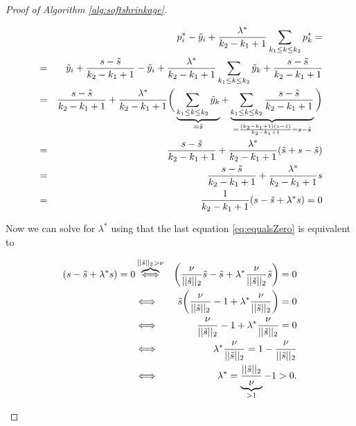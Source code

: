 \begin{proof}[Proof of Algorithm \ref{alg:softshrinkage}]
\begin{enumerate}
                \begin{eqnarray}
                    &&p^{\ast}_{i} - \tilde{y}_{i} + \frac{\lambda^{\ast}}{k_{2} - k_{1} + 1} \sum_{k_{1} \le k \le k_{2}} p^{\ast}_{k} = \notag \\
                    &=& \tilde{y}_{i} + \frac{s - \tilde{s}}{k_{2} - k_{1} + 1} - \tilde{y}_{i} + \frac{\lambda^{\ast}}{k_{2} - k_{1} + 1} \sum_{k_{1} \le k \le k_{2}} \tilde{y}_{k} + \frac{s - \tilde{s}}{k_{2} - k_{1} + 1} \notag \\
                    &=& \frac{s - \tilde{s}}{k_{2} - k_{1} + 1} + \frac{\lambda^{\ast}}{k_{2} - k_{1} + 1} \bigg( \underbrace{\sum_{k_{1} \le k \le k_{2}} \tilde{y}_{k}}_{= \tilde{s}} + \underbrace{\sum_{k_{1} \le k \le k_{2}} \frac{s - \tilde{s}}{k_{2} - k_{1} + 1}}_{= \frac{(k_{2} - k_{1} + 1) (s - \tilde{s})}{k_{2} - k_{1} + 1} = s - \tilde{s}} \bigg) \notag \\
                    &=& \frac{s - \tilde{s}}{k_{2} - k_{1} + 1} + \frac{\lambda^{\ast}}{k_{2} - k_{1} + 1} (\tilde{s} + s - \tilde{s}) \notag \\
                    &=& \frac{s - \tilde{s}}{k_{2} - k_{1} + 1} + \frac{\lambda^{\ast}}{k_{2} - k_{1} + 1}s \notag \\
                    &=& \frac{1}{k_{2} - k_{1} + 1} (s - \tilde{s} + \lambda^{\ast}s) = 0 \label{eq:equalsZero}
                \end{eqnarray}

            Now we can solve for $\lambda^{\ast}$ using that the last equation \ref{eq:equalsZero} is equivalent to

                \begin{eqnarray}
                    (s - \tilde{s} + \lambda^{\ast} s) = 0 &\overbrace{\Longleftrightarrow}^{||\tilde{s}||_{2} > \nu}& \bigg(\frac{\nu}{||\tilde{s}||_{2}}\tilde{s} - \tilde{s} + \lambda^{\ast} \frac{\nu}{||\tilde{s}||_{2}}\tilde{s} \bigg) = 0 \notag \\
                    &\Longleftrightarrow& \tilde{s} \bigg( \frac{\nu}{||\tilde{s}||_{2}} - 1 + \lambda^{\ast} \frac{\nu}{||\tilde{s}||_{2}} \bigg) = 0 \notag \\
                    &\Longleftrightarrow& \frac{\nu}{||\tilde{s}||_{2}} - 1 + \lambda^{\ast} \frac{\nu}{||\tilde{s}||_{2}} = 0 \notag \\
                    &\Longleftrightarrow& \lambda^{\ast} \frac{\nu}{||\tilde{s}||_{2}} = 1 - \frac{\nu}{||\tilde{s}||_{2}} \notag \\
                    &\Longleftrightarrow& \lambda^{\ast} = \underbrace{\frac{||\tilde{s}||_{2}}{\nu}}_{> 1} - 1 > 0. \notag
                \end{eqnarray}


\end{enumerate}
\end{proof}
